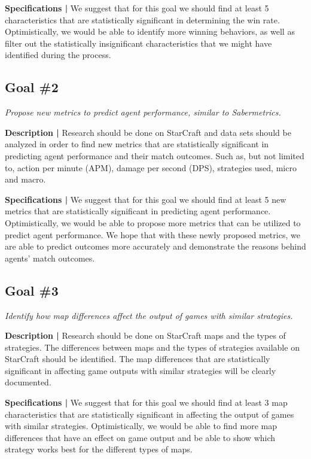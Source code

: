 \documentclass[a4paper,12pt]{report}
\begin{document}
\textbf{Specifications |} We suggest that for this goal we should find at least 5 characteristics that are statistically significant in determining the win rate. Optimistically, we would be able to identify more winning behaviors, as well as filter out the statistically insignificant characteristics that we might have identified during the process. 

\subsection{Goal \#2}

\textit{Propose new metrics to predict agent performance, similar to Sabermetrics.}

\textbf{Description |} Research should be done on StarCraft and data sets should be analyzed in order to find new metrics that are statistically significant in predicting agent performance and their match outcomes. Such as, but not limited to, action per minute (APM), damage per second (DPS), strategies used, micro and macro.

\textbf{Specifications |} We suggest that for this goal we should find at least 5 new metrics that are statistically significant in predicting agent performance. Optimistically, we would be able to propose more metrics that can be utilized to predict agent performance. We hope that with these newly proposed metrics, we are able to predict outcomes more accurately and demonstrate the reasons behind agents’ match outcomes. 

\subsection{Goal \#3}

\textit{Identify how map differences affect the output of games with similar strategies.}

\textbf{Description |} Research should be done on StarCraft maps and the types of strategies. The differences between maps and the types of strategies available on StarCraft should be identified. The map differences that are statistically significant in affecting game outputs with similar strategies will be clearly documented.

\textbf{Specifications |} We suggest that for this goal we should find at least 3 map characteristics that are statistically significant in affecting the output of games with similar strategies. Optimistically, we would be able to find more map differences that have an effect on game output and be able to show which strategy works best for the different types of maps.
\end{document}

